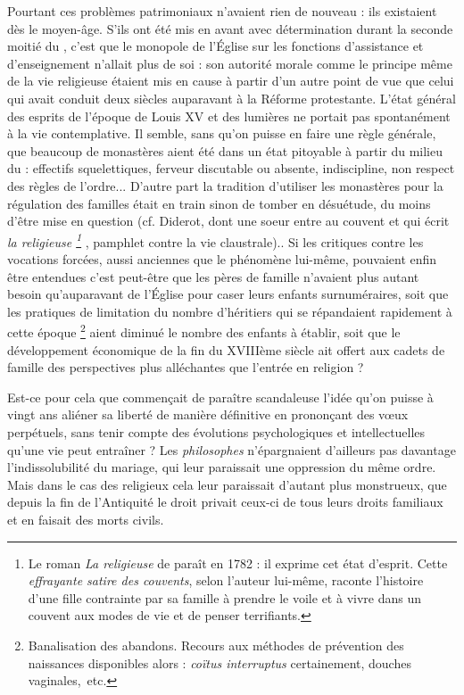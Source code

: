  Pourtant ces problèmes patrimoniaux n'avaient rien de nouveau : ils existaient dès le moyen-âge. S'ils ont été mis en avant avec détermination durant la seconde moitié du , c'est que le monopole de l'Église sur les fonctions d'assistance et d'enseignement n'allait plus de soi : son autorité morale comme le principe même de la vie religieuse étaient mis en cause à partir d'un autre point de vue que celui qui avait conduit deux siècles auparavant à la Réforme protestante. L'état général des esprits de l'époque de Louis XV et des lumières ne portait pas spontanément à la vie contemplative. Il semble, sans qu'on puisse en faire une règle générale, que beaucoup de monastères aient été dans un état pitoyable à partir du milieu du  : effectifs squelettiques, ferveur discutable ou absente, indiscipline, non respect des règles de l'ordre... D'autre part la tradition d'utiliser les monastères pour la régulation des familles était en train sinon de tomber en désuétude, du moins d'être mise en question (cf. Diderot, dont une soeur entre au couvent et qui écrit \emph{la religieuse 
\footnote{Le roman \emph{La religieuse} de  paraît en 1782 : il exprime cet état d'esprit. Cette \emph{effrayante satire des couvents}, selon l'auteur lui-même, raconte l'histoire d'une fille contrainte par sa famille à prendre le voile et à vivre dans un couvent aux modes de vie et de penser terrifiants.} }, pamphlet contre la vie claustrale).. Si les critiques contre les vocations forcées, aussi anciennes que le phénomène lui-même, pouvaient enfin être entendues c'est peut-être que les pères de famille n'avaient plus autant besoin qu'auparavant de l'Église pour caser leurs enfants surnuméraires, soit que les pratiques de limitation du nombre d'héritiers qui se répandaient rapidement à cette époque%
\footnote{Banalisation des abandons. Recours aux méthodes de prévention des naissances disponibles alors : \emph{coïtus interruptus} certainement, douches vaginales,~etc.} 
aient diminué le nombre des enfants à établir, soit que le développement économique de la fin du XVIIIème siècle  ait offert aux cadets de famille des perspectives plus alléchantes que l'entrée en religion ?

 Est-ce pour cela que commençait de paraître scandaleuse
l'idée qu'on puisse à vingt ans aliéner sa liberté de manière définitive en prononçant des vœux perpétuels, sans tenir compte des évolutions psychologiques et intellectuelles qu'une vie peut entraîner ? Les \emph{philosophes} n'épargnaient d'ailleurs pas davantage l'indissolubilité du mariage, qui leur paraissait une oppression du même ordre. Mais dans le cas des religieux cela leur paraissait d'autant plus monstrueux, que depuis la fin de l'Antiquité le droit privait ceux-ci de tous leurs droits familiaux et en faisait des morts civils. 

